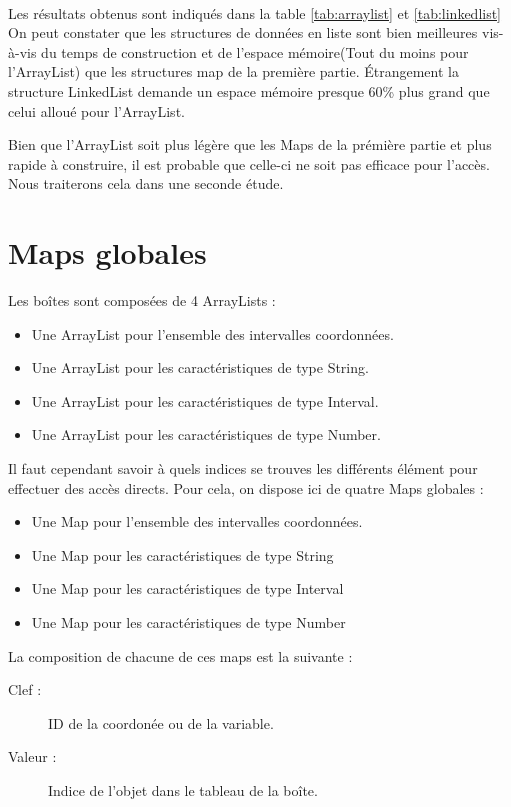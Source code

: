 \paragraph{}Les résultats obtenus sont indiqués dans la table \ref{tab:arraylist} et \ref{tab:linkedlist}
On peut constater que les structures de données en liste sont bien meilleures vis-à-vis du temps de construction et de l'espace mémoire(Tout du moins pour l'ArrayList) que les structures map de la première partie. Étrangement la structure LinkedList demande un espace mémoire presque 60\% plus grand que celui alloué pour l'ArrayList.

Bien que l'ArrayList soit plus légère que les Maps de la prémière partie et plus rapide à construire, il est probable que celle-ci ne soit pas efficace pour l'accès. Nous traiterons cela dans une seconde étude.

\section{Maps globales}
Les boîtes sont composées  de 4 ArrayLists : 
\begin{itemize}
  \item Une ArrayList pour l'ensemble des intervalles coordonnées.
  \item Une ArrayList pour les caractéristiques de type String.
  \item Une ArrayList pour les caractéristiques de type Interval.
  \item Une ArrayList pour les caractéristiques de type Number.
\end{itemize}
Il faut cependant savoir à quels indices se trouves les différents élément pour effectuer des accès directs. Pour cela, on dispose ici de quatre Maps globales :
\begin{itemize}
  \item Une Map pour l'ensemble des intervalles coordonnées.
  \item Une Map pour les caractéristiques de type String
  \item Une Map pour les caractéristiques de type Interval
  \item Une Map pour les caractéristiques de type Number
\end{itemize}
La composition de chacune de ces maps est la suivante :  
\begin{description}
 \item[Clef :]
ID de la coordonée ou de la variable.
\item[Valeur :]
Indice de l'objet dans le tableau de la boîte.
\end{description}


